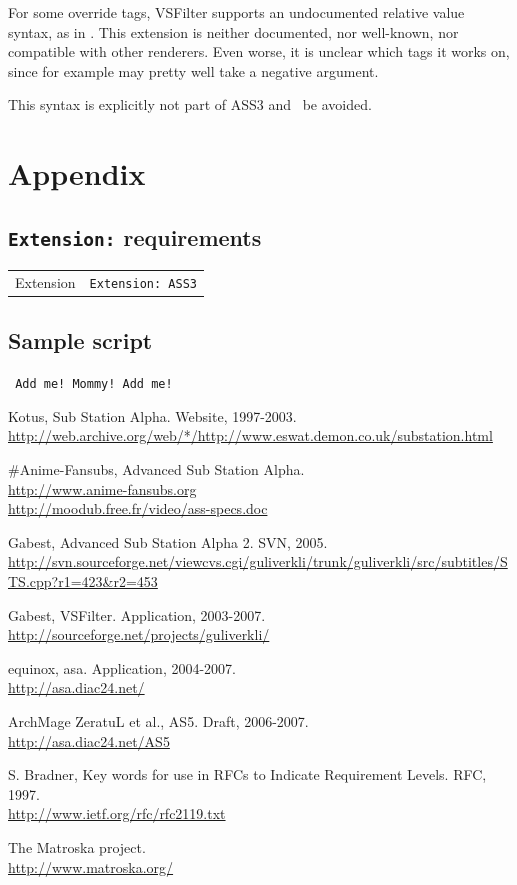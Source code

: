 \documentclass{spec}
\gdef\compat{}
\begin{document}
For some override tags, VSFilter supports an undocumented relative value
syntax, as in . This extension is neither documented, nor well-known,
nor compatible with other renderers. Even worse, it is unclear which tags
it works on, since for example  may pretty well take a negative
argument.

This syntax is explicitly not part of ASS3 and \should\ be avoided.

\appendix
\section{Appendix}
\subsection{\texttt{Extension:} requirements}

\begin{tabular}{ll}
Extension & \texttt{Extension:~ASS3}\\[6pt]
\compat
\end{tabular}

\subsection{\todo Sample script}

\texttt{\footnotesize
Add me! Mommy! Add me!
}

\begin{thebibliography}{1}
 Kotus, Sub Station Alpha. Website, 1997-2003.\\
\url{http://web.archive.org/web/*/http://www.eswat.demon.co.uk/substation.html}

 \#Anime-Fansubs, Advanced Sub Station Alpha.\\
\url{http://www.anime-fansubs.org}\\
\url{http://moodub.free.fr/video/ass-specs.doc}

 Gabest, Advanced Sub Station Alpha 2. SVN, 2005.\\
\url{http://svn.sourceforge.net/viewcvs.cgi/guliverkli/trunk/guliverkli/src/subtitles/STS.cpp?r1=423&r2=453}

 Gabest, VSFilter. Application, 2003-2007.\\
\url{http://sourceforge.net/projects/guliverkli/}

 equinox, asa. Application, 2004-2007.\\
\url{http://asa.diac24.net/}

 ArchMage ZeratuL et al., AS5. Draft, 2006-2007.\\
\url{http://asa.diac24.net/AS5}

 S. Bradner, Key words for use in RFCs to Indicate Requirement Levels. RFC, 1997.\\
\url{http://www.ietf.org/rfc/rfc2119.txt}

 The Matroska project.\\
\url{http://www.matroska.org/}

\end{thebibliography}
\end{document}
